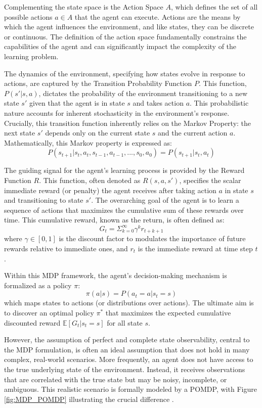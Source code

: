 Complementing the state space is the Action Space \(A\), which defines the set of all possible actions \(a \in A\) that the agent can execute. Actions are the means by which the agent influences the environment, and like states, they can be discrete or continuous. The definition of the action space fundamentally constrains the capabilities of the agent and can significantly impact the complexity of the learning problem.

The dynamics of the environment, specifying how states evolve in response to actions, are captured by the Transition Probability Function \(P\). This function, \(P(s' | s, a)\), dictates the probability of the environment transitioning to a new state \(s'\) given that the agent is in state \(s\) and takes action \(a\). This probabilistic nature accounts for inherent stochasticity in the environment's response. Crucially, this transition function inherently relies on the Markov Property: the next state \(s'\) depends only on the current state \(s\) and the current action \(a\). Mathematically, this Markov property is expressed as:
\[P(s_{t+1}| s_t, a_t, s_{t-1}, a_{t-1}, ..., s_0, a_0) = P(s_{t+1} | s_t, a_t)\]

The guiding signal for the agent's learning process is provided by the Reward Function \(R\). This function, often denoted as \(R(s, a, s')\), specifies the scalar immediate reward (or penalty) the agent receives after taking action \(a\) in state \(s\) and transitioning to state \(s'\). The overarching goal of the agent is to learn a sequence of actions that maximizes the cumulative sum of these rewards over time. This cumulative reward, known as the return, is often defined as:
\[G_t = \Sigma_{k=0}^\infty \gamma^k r_{t+k+1}\]
where \(\gamma \in [0,1]\) is the discount factor to modulates the importance of future rewards relative to immediate ones, and \(r_t\) is the immediate reward at time step \(t\).

Within this MDP framework, the agent's decision-making mechanism is formalized as a policy \(\pi\):
\[\pi(a|s) = P(a_t = a | s_t = s)\]
which maps states to actions (or distributions over actions). The ultimate aim is to discover an optimal policy \(\pi^*\) that maximizes the expected cumulative discounted reward \(\mathbb{E}[G_t | s_t = s]\) for all state \(s\).

However, the assumption of perfect and complete state observability, central to the \gls{MDP} formulation, is often an ideal assumption that does not hold in many complex, real-world scenarios. More frequently, an agent does not have access to the true underlying state of the environment. Instead, it receives observations that are correlated with the true state but may be noisy, incomplete, or ambiguous. This realistic scenario is formally modeled by a \gls{POMDP}, with Figure \ref{fig:MDP_POMDP} illustrating the crucial difference \cite{Blumenthal2024}.

